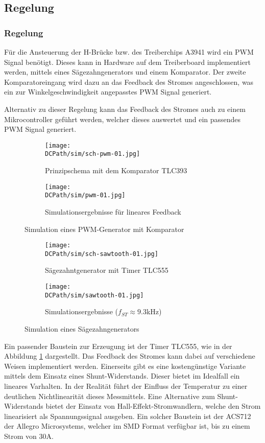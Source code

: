 \ifSTANDALONE
\subsection{Regelung}
\fi
\ifEMBED
\subsubsection{Regelung}
\fi
Für die Ansteuerung der H-Brücke bzw. des Treiberchips A3941 wird ein PWM
Signal benötigt. Dieses kann in Hardware auf dem Treiberboard implementiert
werden, mittels eines Sägezahngenerators und einem Komparator. Der zweite
Komparatoreingang wird dazu an das Feedback des Stromes angeschlossen, was
ein zur Winkelgeschwindigkeit angepasstes PWM Signal generiert.

\noindent Alternativ zu dieser Regelung kann das Feedback des Stromes auch zu 
einem Mikrocontroller geführt werden, welcher dieses auswertet und ein passendes
PWM Signal generiert.

\begin{figure}[h!]
    \centering
    \begin{subfigure}[b]{0.45\textwidth}
        \texttt{[image: \\DCPath/sim/sch-pwm-01.jpg]}
        \caption{Prinzipschema mit dem Komparator TLC393}
    \end{subfigure}
    \begin{subfigure}[b]{0.45\textwidth}
        \texttt{[image: \\DCPath/sim/pwm-01.jpg]}
        \caption{Simulationsergebnisse für lineares Feedback}
    \end{subfigure}
    \caption{Simulation eines PWM-Generator mit Komparator}
\end{figure}

\begin{figure}[h!]
    \centering
    \begin{subfigure}[b]{0.45\textwidth}
        \texttt{[image: \\DCPath/sim/sch-sawtooth-01.jpg]}
        \caption{Sägezahntgenerator mit Timer TLC555}
    \end{subfigure}
    \begin{subfigure}[b]{0.45\textwidth}
        \texttt{[image: \\DCPath/sim/sawtooth-01.jpg]}
        \caption{Simulationsergebnisse ($f_{ST} \approx 9.3$kHz)}
    \end{subfigure}
    \caption{Simulation eines Sägezahngenerators}
    \label{fig:sawtooth}
\end{figure}

\noindent Ein passender Baustein zur Erzeugung ist der Timer TLC555, wie in der
Abbildung \ref{fig:sawtooth} dargestellt. Das Feedback des Stromes kann
dabei auf verschiedene Weisen implementiert werden. Einerseits gibt es eine
kostengünstige Variante mittels dem Einsatz eines Shunt-Widerstands. Dieser
bietet im Idealfall ein lineares Varhalten. In der Realität führt der
Einfluss der Temperatur zu einer deutlichen Nichtlinearität dieses
Messmittels. Eine Alternative zum Shunt-Widerstands bietet der Einsatz von
Hall-Effekt-Stromwandlern, welche den Strom linearisiert als Spannungssignal
ausgeben. Ein solcher Baustein ist der ACS712 der Allegro Microsystems,
welcher im SMD Format verfügbar ist, bis zu einem Strom von 30A.

